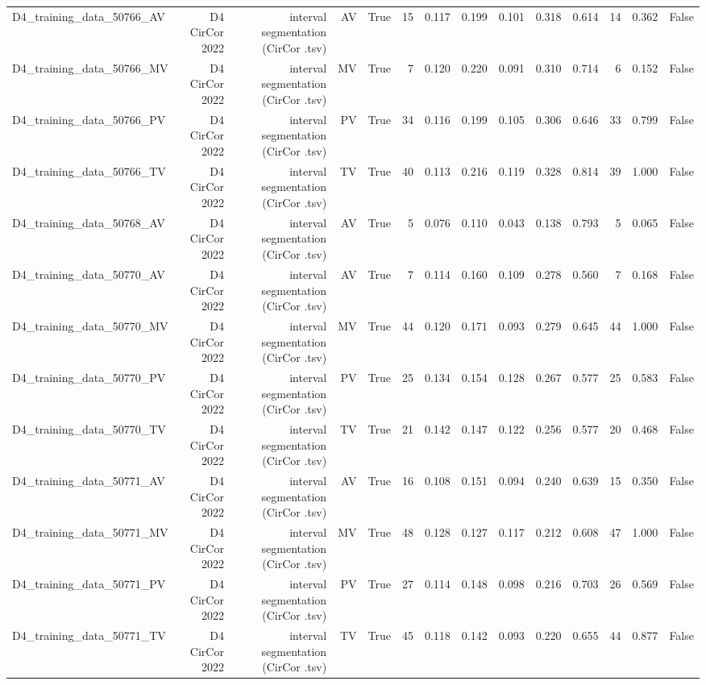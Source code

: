\begin{table}[htbp]
\begin{tabular}{lrrrrrrrrrrrrr}
    D4\_training\_data\_50766\_AV & D4 CirCor 2022 & interval segmentation (CirCor .tsv) & AV & True & 15 & 0.117 & 0.199 & 0.101 & 0.318 & 0.614 & 14 & 0.362 & False \\
    D4\_training\_data\_50766\_MV & D4 CirCor 2022 & interval segmentation (CirCor .tsv) & MV & True & 7 & 0.120 & 0.220 & 0.091 & 0.310 & 0.714 & 6 & 0.152 & False \\
    D4\_training\_data\_50766\_PV & D4 CirCor 2022 & interval segmentation (CirCor .tsv) & PV & True & 34 & 0.116 & 0.199 & 0.105 & 0.306 & 0.646 & 33 & 0.799 & False \\
    D4\_training\_data\_50766\_TV & D4 CirCor 2022 & interval segmentation (CirCor .tsv) & TV & True & 40 & 0.113 & 0.216 & 0.119 & 0.328 & 0.814 & 39 & 1.000 & False \\
    D4\_training\_data\_50768\_AV & D4 CirCor 2022 & interval segmentation (CirCor .tsv) & AV & True & 5 & 0.076 & 0.110 & 0.043 & 0.138 & 0.793 & 5 & 0.065 & False \\
    D4\_training\_data\_50770\_AV & D4 CirCor 2022 & interval segmentation (CirCor .tsv) & AV & True & 7 & 0.114 & 0.160 & 0.109 & 0.278 & 0.560 & 7 & 0.168 & False \\
    D4\_training\_data\_50770\_MV & D4 CirCor 2022 & interval segmentation (CirCor .tsv) & MV & True & 44 & 0.120 & 0.171 & 0.093 & 0.279 & 0.645 & 44 & 1.000 & False \\
    D4\_training\_data\_50770\_PV & D4 CirCor 2022 & interval segmentation (CirCor .tsv) & PV & True & 25 & 0.134 & 0.154 & 0.128 & 0.267 & 0.577 & 25 & 0.583 & False \\
    D4\_training\_data\_50770\_TV & D4 CirCor 2022 & interval segmentation (CirCor .tsv) & TV & True & 21 & 0.142 & 0.147 & 0.122 & 0.256 & 0.577 & 20 & 0.468 & False \\
    D4\_training\_data\_50771\_AV & D4 CirCor 2022 & interval segmentation (CirCor .tsv) & AV & True & 16 & 0.108 & 0.151 & 0.094 & 0.240 & 0.639 & 15 & 0.350 & False \\
    D4\_training\_data\_50771\_MV & D4 CirCor 2022 & interval segmentation (CirCor .tsv) & MV & True & 48 & 0.128 & 0.127 & 0.117 & 0.212 & 0.608 & 47 & 1.000 & False \\
    D4\_training\_data\_50771\_PV & D4 CirCor 2022 & interval segmentation (CirCor .tsv) & PV & True & 27 & 0.114 & 0.148 & 0.098 & 0.216 & 0.703 & 26 & 0.569 & False \\
    D4\_training\_data\_50771\_TV & D4 CirCor 2022 & interval segmentation (CirCor .tsv) & TV & True & 45 & 0.118 & 0.142 & 0.093 & 0.220 & 0.655 & 44 & 0.877 & False \\

\end{tabular}
\end{table}

